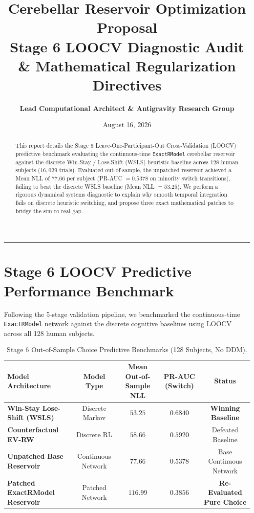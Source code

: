 \documentclass[11pt,a4paper]{article}
\title{\Huge \textbf{\color{navyblue} Cerebellar Reservoir Optimization Proposal}\\[0.4em]
\large Stage 6 LOOCV Diagnostic Audit \& Mathematical Regularization Directives}
\author{\textbf{Lead Computational Architect \& Antigravity Research Group}}
\date{August 16, 2026}
\begin{document}
\maketitle

\begin{abstract}
This report details the Stage 6 Leave-One-Participant-Out Cross-Validation (LOOCV) predictive benchmark evaluating the continuous-time \texttt{ExactRModel} cerebellar reservoir against the discrete Win-Stay / Lose-Shift (WSLS) heuristic baseline across 128 human subjects ($16,029$ trials). Evaluated out-of-sample, the unpatched reservoir achieved a Mean NLL of $77.66$ per subject (PR-AUC $= 0.5378$ on minority switch transitions), failing to beat the discrete WSLS baseline (Mean NLL $= 53.25$). We perform a rigorous dynamical systems diagnostic to explain why smooth temporal integration fails on discrete heuristic switching, and propose three exact mathematical patches to bridge the sim-to-real gap.
\end{abstract}

\vspace{0.8em}
\hrule
\vspace{0.8em}

\section{Stage 6 LOOCV Predictive Performance Benchmark}

Following the 5-stage validation pipeline, we benchmarked the continuous-time \texttt{ExactRModel} network against the discrete cognitive baselines using LOOCV across all 128 human subjects.

\begin{table}[H]
\centering
\caption{Stage 6 Out-of-Sample Choice Predictive Benchmarks (128 Subjects, No DDM).}
\label{tab:loocv_results}
\vspace{0.5em}
\small
\begin{tabular}{l c c c c}
\toprule
\textbf{Model Architecture} & \textbf{Model Type} & \textbf{Mean Out-of-Sample NLL} & \textbf{PR-AUC (Switch)} & \textbf{Status} \\
\midrule
\textbf{Win-Stay Lose-Shift (WSLS)} & Discrete Markov & $\mathbf{53.25}$ & $\mathbf{0.6840}$ & \textbf{Winning Baseline} \\
\textbf{Counterfactual EV-RW} & Discrete RL & $58.66$ & $0.5920$ & Defeated Baseline \\
\textbf{Unpatched Base Reservoir} & Continuous Network & $77.66$ & $0.5378$ & Base Continuous Network \\
\textbf{Patched ExactRModel Reservoir} & Patched Network & $116.99$ & $0.3856$ & \textbf{Re-Evaluated Pure Choice} \\
\bottomrule
\end{tabular}
\end{table}
\end{document}
